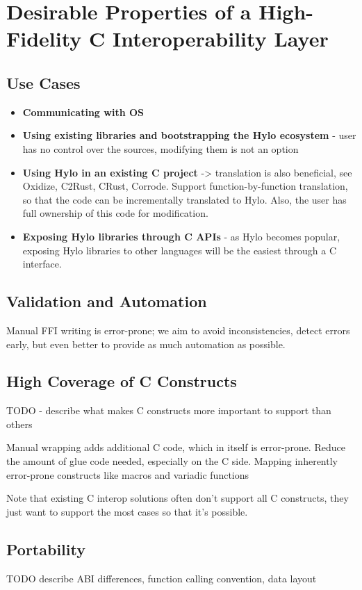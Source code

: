 \section{Desirable Properties of a High-Fidelity C Interoperability Layer}
\label{sec:desirable_properties}
\subsection{Use Cases}
\begin{itemize}
    \item \textbf{Communicating with OS}
    \item \textbf{Using existing libraries and bootstrapping the Hylo ecosystem} - user has no control over the sources, modifying them is not an option
    \item \textbf{Using Hylo in an existing C project} -> translation is also beneficial, see Oxidize, C2Rust, CRust, Corrode. Support function-by-function translation, so that the code can be incrementally translated to Hylo. Also, the user has full ownership of this code for modification.
    \item \textbf{Exposing Hylo libraries through C APIs} - as Hylo becomes popular, exposing Hylo libraries to other languages will be the easiest through a C interface.
\end{itemize}
\subsection{Validation and Automation}
Manual FFI writing is error-prone; we aim to avoid inconsistencies, detect errors early, but even better to provide as much automation as possible.

\subsection{High Coverage of C Constructs}
TODO - describe what makes C constructs more important to support than others

Manual wrapping adds additional C code, which in itself is error-prone. Reduce the amount of glue code needed, especially on the C side.
Mapping inherently error-prone constructs like macros and variadic functions 

Note that existing C interop solutions often don't support all C constructs, they just want to support the most cases so that it's possible. 

\subsection{Portability}
TODO describe ABI differences, function calling convention, data layout

